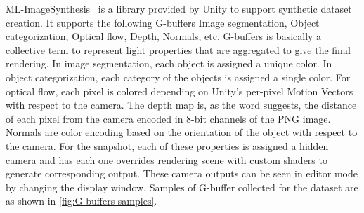 ML-ImageSynthesis~\cite{imagesynthesis} is a library provided by Unity to support synthetic dataset creation.
It supports the following G-buffers Image segmentation, Object categorization, Optical flow, Depth, Normals, etc.
G-buffers is basically a collective term to represent light properties that are aggregated to give the final rendering.
In image segmentation, each object is assigned a unique color.
In object categorization, each category of the objects is assigned a single color.
For optical flow, each pixel is colored depending on Unity's per-pixel Motion Vectors with respect to the camera.
The depth map is, as the word suggests, the distance of each pixel from the camera encoded in 8-bit channels of the PNG image.
Normals are color encoding based on the orientation of the object with respect to the camera.
For the snapshot, each of these properties is assigned a hidden camera and has each one overrides rendering scene with custom shaders to generate corresponding output.
These camera outputs can be seen in editor mode by changing the display window.
Samples of G-buffer collected for the dataset are as shown in \autoref{fig:G-buffers-samples}.

